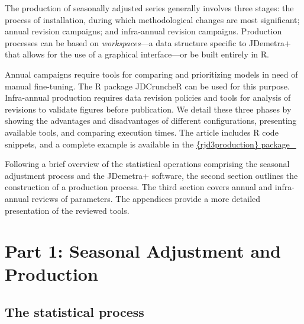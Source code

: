 \documentclass[
  letterpaper,
  DIV=11,
  numbers=noendperiod]{scrreprt}
\begin{document}
The production of seasonally adjusted series generally involves three
stages: the process of installation, during which methodological changes
are most significant; annual revision campaigns; and infra-annual
revision campaigns. Production processes can be based on
\emph{workspaces}---a data structure specific to JDemetra+ that allows
for the use of a graphical interface---or be built entirely in R.

Annual campaigns require tools for comparing and prioritizing models in
need of manual fine-tuning. The R package JDCruncheR can be used for
this purpose. Infra-annual production requires data revision policies
and tools for analysis of revisions to validate figures before
publication. We detail these three phases by showing the advantages and
disadvantages of different configurations, presenting available tools,
and comparing execution times. The article includes R code snippets, and
a complete example is available in the
\href{https://inseefr.github.io/rjd3production/articles/process.html}{\{rjd3production\}
package~🔗}

Following a brief overview of the statistical operations comprising the
seasonal adjustment process and the JDemetra+ software, the second
section outlines the construction of a production process. The third
section covers annual and infra-annual reviews of parameters. The
appendices provide a more detailed presentation of the reviewed tools.


\hypertarget{part-1-seasonal-adjustment-and-production}{%
\chapter*{Part 1: Seasonal Adjustment and
Production}\label{part-1-seasonal-adjustment-and-production}}


\hypertarget{the-statistical-process}{%
\section*{The statistical process}\label{the-statistical-process}}

\end{document}
